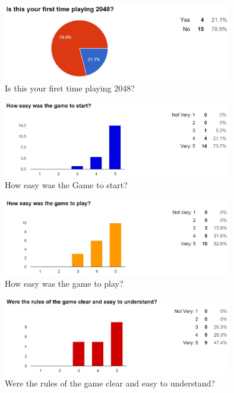 \documentclass[12pt]{article}
\begin{document}
\begin{figure}[H]
	\centering
	\includegraphics[width = 10cm]{Before}
	\caption{Is this your first time playing 2048?}
	\label{Is this your first time playing 2048?}
\end{figure}

\begin{figure}[H]
	\centering
	\includegraphics[width = 10cm]{Easy_Start}
	\caption{How easy was the Game to start?}
	\label{How easy was the Game to start?}
\end{figure}

\begin{figure}[H]
	\centering
	\includegraphics[width = 10cm]{Easy_Play}
	\caption{How easy was the game to play?}
	\label{How easy was the game to play?}
\end{figure}

\begin{figure}[H]
	\centering
	\includegraphics[width = 10cm]{Rules}
	\caption{Were the rules of the game clear and easy to understand?}
	\label{Were the rules of the game clear and easy to understand?}
\end{figure}
\end{document}
